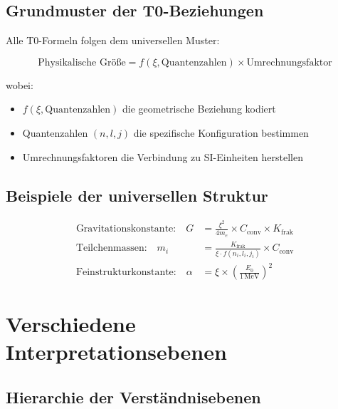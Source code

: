\documentclass[12pt,a4paper]{article}
\newcommand{\xipar}{\xi}
\newcommand{\Kfrak}{K_{\text{frak}}}
\begin{document}
	\subsection{Grundmuster der T0-Beziehungen}
	
	Alle T0-Formeln folgen dem universellen Muster:
	
	\begin{equation}
		\boxed{\text{Physikalische Größe} = f(\xipar, \text{Quantenzahlen}) \times \text{Umrechnungsfaktor}}
		\label{eq:universal_pattern}
	\end{equation}
	
	wobei:
	\begin{itemize}
		\item $f(\xipar, \text{Quantenzahlen})$ die geometrische Beziehung kodiert
		\item Quantenzahlen $(n,l,j)$ die spezifische Konfiguration bestimmen
		\item Umrechnungsfaktoren die Verbindung zu SI-Einheiten herstellen
	\end{itemize}
	
	\subsection{Beispiele der universellen Struktur}
	
	\begin{align}
		\text{Gravitationskonstante:} \quad G &= \frac{\xipar^2}{4m_e} \times C_{\text{conv}} \times \Kfrak \\
		\text{Teilchenmassen:} \quad m_i &= \frac{\Kfrak}{\xipar \cdot f(n_i,l_i,j_i)} \times C_{\text{conv}} \\
		\text{Feinstrukturkonstante:} \quad \alpha &= \xipar \times \left(\frac{E_0}{1\,\mathrm{MeV}}\right)^2
	\end{align}
	
	\section{Verschiedene Interpretationsebenen}
	
	\subsection{Hierarchie der Verständnisebenen}
	
\end{document}
